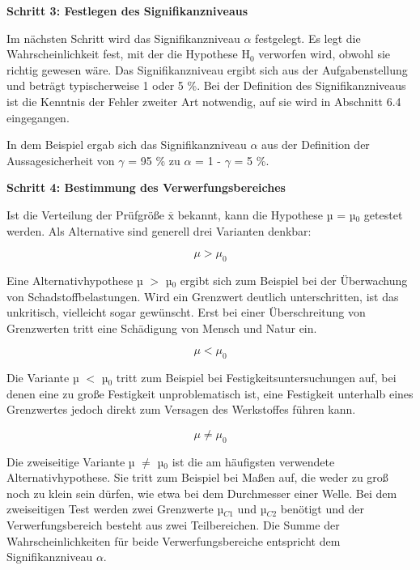{\selectfont
\noindent\textbf{Schritt 3: Festlegen des Signifikanzniveaus}}\smallskip

\noindent Im n\"{a}chsten Schritt wird das Signifikanzniveau $\alpha$ festgelegt. Es legt die Wahrscheinlichkeit fest, mit der die Hypothese H$_{0}$ verworfen wird, obwohl sie richtig gewesen w\"{a}re. Das Signifikanzniveau ergibt sich aus der Aufgabenstellung und betr\"{a}gt typischerweise 1 oder 5 \%. Bei der Definition des Signifikanzniveaus ist die Kenntnis der Fehler zweiter Art notwendig, auf sie wird in Abschnitt 6.4 eingegangen.\newline

\noindent In dem Beispiel ergab sich das Signifikanzniveau $\alpha$ aus der Definition der Aussagesicherheit von $\gamma$ = 95 \% zu $\alpha$ = 1 - $\gamma$ = 5 \%. \bigskip

{\selectfont
\noindent\textbf{Schritt 4: Bestimmung des Verwerfungsbereiches}}\smallskip

\noindent Ist die Verteilung der Pr\"{u}fgr\"{o}{\ss}e $\overline{\mathrm{x}}$ bekannt, kann die Hypothese µ = µ$_{0}$ getestet werden. Als Alternative sind generell drei Varianten denkbar:

\begin{equation}\label{eq:sixeleven}
\mu >\mu _{0}
\end{equation}

\noindent Eine Alternativhypothese µ $\mathrm{>}$ µ$_{0}$ ergibt sich zum Beispiel bei der \"{U}berwachung von Schadstoffbelastungen. Wird ein Grenzwert deutlich unterschritten, ist das unkritisch, vielleicht sogar gew\"{u}nscht. Erst bei einer \"{U}berschreitung von Grenzwerten tritt eine Sch\"{a}digung von Mensch und Natur ein.

\begin{equation}\label{eq:sixtwelve}
\mu <\mu _{0}
\end{equation}

Die Variante µ $\mathrm{<}$ µ$_{0}$ tritt zum Beispiel bei Festigkeitsuntersuchungen auf, bei denen eine zu gro{\ss}e Festigkeit unproblematisch ist, eine Festigkeit unterhalb eines Grenzwertes jedoch direkt zum Versagen des Werkstoffes f\"{u}hren kann. 

\begin{equation}\label{eq:sixthirteen}
\mu \ne\mu _{0}
\end{equation}

\noindent Die zweiseitige Variante µ $\neq$ µ$_{0}$ ist die am h\"{a}ufigsten verwendete Alternativhypothese. Sie tritt zum Beispiel bei Ma{\ss}en auf, die weder zu gro{\ss} noch zu klein sein d\"{u}rfen, wie etwa bei dem Durchmesser einer Welle. Bei dem zweiseitigen Test werden zwei Grenzwerte µ$_{C1}$ und µ$_{C2}$ ben\"{o}tigt und der Verwerfungsbereich besteht aus zwei Teilbereichen. Die Summe der Wahrscheinlichkeiten f\"{u}r beide Verwerfungsbereiche entspricht dem Signifikanzniveau $\alpha$.\newline

